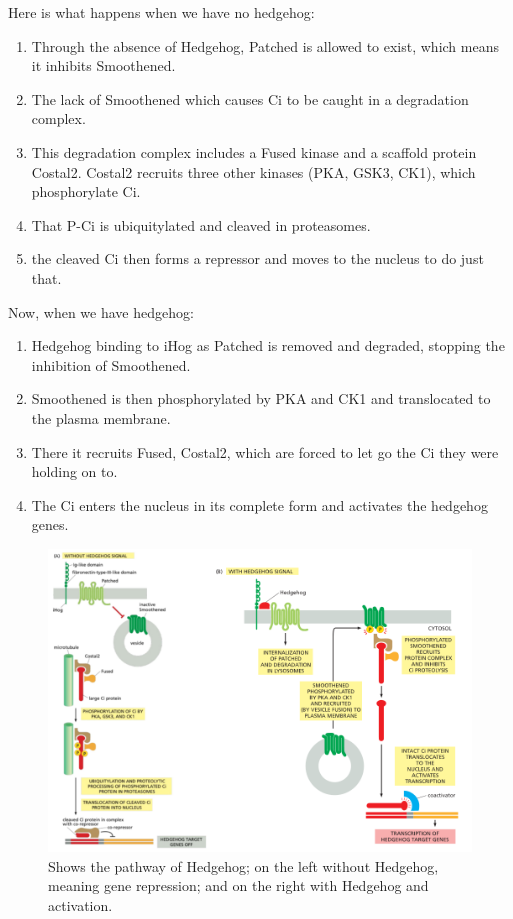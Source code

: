 \documentclass[../main.tex]{subfiles}
\begin{document}
Here is what happens when we have no hedgehog:
\begin{enumerate}
	\item Through the absence of Hedgehog, \gls{Patched} is allowed to exist, which means it inhibits \gls{Smoothened}. 
	\item The lack of Smoothened which causes Ci to be caught in a degradation complex.
	\item This degradation complex includes a Fused kinase and a scaffold protein \gls{Costal2}. Costal2 recruits three other kinases (PKA, GSK3, CK1), which phosphorylate Ci. 
	\item That P-Ci is ubiquitylated and cleaved in proteasomes.
	\item the cleaved Ci then forms a repressor and moves to the nucleus to do just that.
\end{enumerate}

Now, when we have hedgehog:
\begin{enumerate}
	\item Hedgehog binding to \gls{iHog} as \gls{Patched} is removed and degraded, stopping the inhibition of Smoothened. 
	\item Smoothened is then phosphorylated by PKA and CK1 and translocated to the plasma membrane.
	\item There it recruits Fused, Costal2, which are forced to let go the Ci they were holding on to.
	\item The Ci enters the nucleus in its complete form and activates the hedgehog genes.
\end{enumerate}

\begin{figure}[H]
	\centering
	\includegraphics[width=0.8\linewidth]{Hedge_path}
	\caption{Shows the pathway of Hedgehog; on the left without Hedgehog, meaning gene repression; and on the right with Hedgehog and activation.}
\end{figure}
\end{document}
